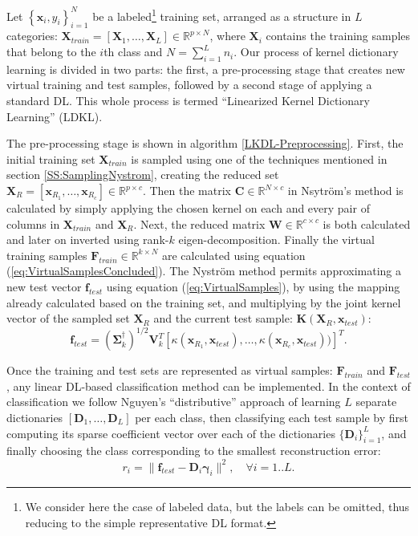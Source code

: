 \documentclass[journal]{IEEEtran}
\newcommand{\bD}{\mathbf{D}}
\newcommand{\bx}{\mathbf{x}}
\newcommand{\bbf}{\mathbf{f}}
\newcommand{\bX}{\mathbf{X}}
\newcommand{\bK}{\mathbf{K}}
\newcommand{\bF}{\mathbf{F}}
\newcommand{\bC}{\mathbf{C}}
\newcommand{\bW}{\mathbf{W}}
\newcommand{\bgamma}{\boldsymbol{\gamma}}
\begin{document}
Let $\left\{\bx_i,y_i\right\}_{i=1}^N$ be a labeled\footnote{We consider here the case of labeled data, but the labels can be omitted, thus reducing to the simple representative DL format.} training set, arranged as a structure in $L$ categories: $\bX_{train}=\left[\bX_1,\ldots,\bX_L\right] \in \mathbb{R}^{p \times N}$, where $\bX_i$ contains the training samples that belong to the $i$th class and $N = \sum \nolimits_{i=1}^{L} n_i$. Our process of kernel dictionary learning is divided in two parts: the first, a pre-processing stage that creates new virtual training and test samples, followed by a second stage of applying a standard DL. This whole process is termed ``Linearized Kernel Dictionary Learning'' (LDKL).

The pre-processing stage is shown in algorithm \ref{LKDL-Preprocessing}. First, the initial training set $\bX_{train}$ is sampled using one of the techniques mentioned in section \ref{SS:SamplingNystrom}, creating the reduced set $\bX_R = [\bx_{R_1},\ldots,\bx_{R_c}] \in \mathbb{R}^{p \times c}$. Then the matrix $\bC \in \mathbb{R}^{N \times c}$ in Nsytr\"{o}m's method is calculated by simply applying the chosen kernel on each and every pair of columns in $\bX_{train}$ and $\bX_R$. Next, the reduced matrix $\bW \in \mathbb{R}^{c \times c}$ is both calculated and later on inverted using rank-$k$ eigen-decomposition.
Finally the virtual training samples $\bF_{train} \in \mathbb{R}^{k \times N}$ are calculated using equation (\ref{eq:VirtualSamplesConcluded}). The Nystr\"{o}m method permits approximating a new test vector $\bbf_{test}$ using equation (\ref{eq:VirtualSamples}), by using the mapping already calculated based on the training set, and multiplying by the joint kernel vector of the sampled set $\bX_R$ and the current test sample: $\bK(\bX_R,\bx_{test})$:
\begin{equation}\label{eq:MappingTest}
    \boldsymbol{f}_{test} = \left(\boldsymbol{\Sigma}_k^{\dagger} \right)^{1/2} \mathbf{V}_k^T \left[\kappa(\bx_{R_1},\bx_{test}),\ldots,\kappa(\bx_{R_c},\bx_{test}))\right]^T.
\end{equation}

Once the training and test sets are represented as virtual samples: $\bF_{train}$ and $\bF_{test}$, any linear DL-based classification method can be implemented. In the context of classification we follow Nguyen's ``distributive'' approach \cite{KDL2} of learning $L$ separate dictionaries $[\bD_1,\ldots,\bD_L]$ per each class, then classifying each test sample by first computing its sparse coefficient vector over each of the dictionaries $\{\bD_i\}_{i=1}^L$, and finally choosing the class corresponding to the smallest reconstruction error:
\begin{equation}\label{eq:classification}
r_i = \|\boldsymbol{f}_{test}-\bD_i \bgamma_i\|^2, \quad \forall i=1..L.
\end{equation}
\end{document}
